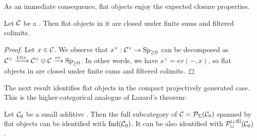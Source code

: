 \documentclass[a4paper,10pt, oneside]{amsart}
\begin{document}
	As an immediate consequence, flat objects enjoy the expected closure properties.
	\begin{cor}
		Let $\mathcal{C}$ be a \dualaddinfcat. Then
		flat objects in it are closed under finite sums and filtered colimits.
		
	\end{cor}
	\begin{proof}
		Let $x\in\mathcal{C}$. We observe that $x^\vee:\mathcal{C}^\vee\to \operatorname{Sp}_{\geq0}$ can be decomposed as $\mathcal{C}^\vee \xrightarrow{1\otimes x}\mathcal{C}^\vee \otimes \mathcal{C}\xrightarrow{ev} \operatorname{Sp}_{\geq0}$. In other words, we have $x^\vee= ev(-, x)$, so flat objects in \mcc are closed under finite sums and filtered colimits.
	\end{proof}
	The next result identifies flat objects in the compact projectively generated case. This is the higher-categorical analogue of Lazard's theorem:
	\begin{prop}\label{lazardthm}
		Let $\mathcal{C}_0$ be a small additive \infcat. Then the full subcategory of $\mathcal{C}=\mathcal{P}_\Sigma(\mathcal{C}_0)$ spanned by flat objects can be identified with $\mathrm{Ind}(\mathcal{C}_0)$. It can be also identified with $\mathcal{P}_{\sqcup}^{\sqcup,\mathrm{fil}}(\mathcal{C}_0)$.
	\end{prop}
\end{document}
